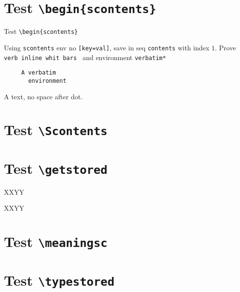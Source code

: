 \documentclass{article}
\begin{document}
\section{Test \texttt{\textbackslash begin\{scontents\}}}
Test \verb+\begin{scontents}+ \par

\begin{scontents}
Using \verb+scontents+ env no \verb+[key=val]+, save in seq \verb+contents+ 
with index $1$.
Prove \verb*| verb inline whit bars | and environment \verb+verbatim*+
\begin{verbatim}
     A verbatim  
       environment
\end{verbatim}
A text, no space after dot.
\end{scontents}

\section{Test \texttt{\textbackslash Scontents}}


\section{Test \texttt{\textbackslash getstored}}

XXYY\par
XXYY

\section{Test \texttt{\textbackslash meaningsc}}

\par


\section{Test \texttt{\textbackslash typestored}}


\end{document}
